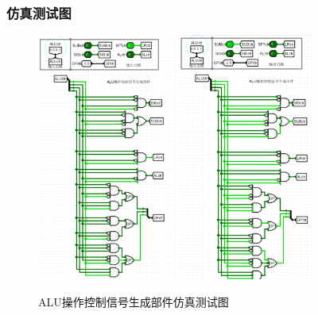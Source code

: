 \documentclass{article}
\begin{document}
    \subsubsection{仿真测试图}
    \begin{figure}[H]
    \centering
    \includegraphics[width=0.4\textwidth]{5.5.1.png}
    \includegraphics[width=0.4\textwidth]{5.5.2.png}
    \caption{ALU操作控制信号生成部件仿真测试图}
    \end{figure}
\end{document}
